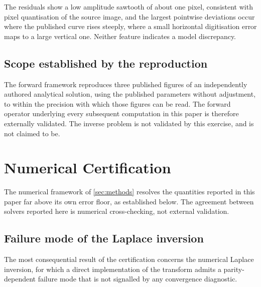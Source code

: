 \documentclass[preprint,12pt,a4paper]{elsarticle}
\theoremstyle{plain}
\theoremstyle{definition}
\theoremstyle{remark}
\begin{document}
The residuals show a low amplitude sawtooth of about one pixel, consistent with
pixel quantisation of the source image, and the largest pointwise deviations
occur where the published curve rises steeply, where a small horizontal
digitisation error maps to a large vertical one. Neither feature indicates a
model discrepancy.



\subsection{Scope established by the reproduction}
\label{sec:val-interp}

The forward framework reproduces three published figures of an independently
authored analytical solution, using the published parameters without
adjustment, to within the precision with which those figures can be read. The
forward operator underlying every subsequent computation in this paper is
therefore externally validated. The inverse problem is not validated by this
exercise, and is not claimed to be.

\section{Numerical Certification}
\label{sec:certification}

The numerical framework of \cref{sec:methods} resolves the quantities reported
in this paper far above its own error floor, as established below.
The agreement between solvers reported here is numerical cross-checking, not
external validation.

\subsection{Failure mode of the Laplace inversion}
\label{sec:cert-talbot}

The most consequential result of the certification concerns the numerical
Laplace inversion, for which a direct implementation of the transform admits a
parity-dependent failure mode that is not signalled by any convergence
diagnostic.
\end{document}
